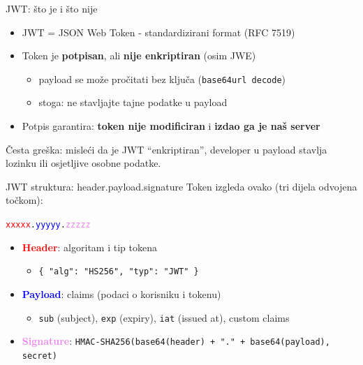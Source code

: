 \begin{frame}{JWT: što je i što nije}
	\begin{itemize}
		\item JWT = JSON Web Token - standardizirani format (RFC 7519)
		\item Token je \textbf{potpisan}, ali \textbf{nije enkriptiran} (osim JWE)
		\begin{itemize}
			\item payload se može pročitati bez ključa (\texttt{base64url decode})
			\item stoga: ne stavljajte tajne podatke u payload
		\end{itemize}
		\item Potpis garantira: \textbf{token nije modificiran} i \textbf{izdao ga je naš server}
	\end{itemize}

	\vspace{0.6em}
	Česta greška: misleći da je JWT \enquote{enkriptiran}, developer u payload stavlja lozinku ili osjetljive osobne podatke.
\end{frame}

\begin{frame}{JWT struktura: header.payload.signature}
	Token izgleda ovako (tri dijela odvojena točkom):
	\vspace{0.3em}
	\begin{center}
		\texttt{\textcolor{red}{xxxxx}.\textcolor{blue}{yyyyy}.\textcolor{violet}{zzzzz}}
	\end{center}

	\vspace{0.6em}
	\begin{itemize}
		\item \textcolor{red}{\textbf{Header}}: algoritam i tip tokena
		\begin{itemize}
			\item \texttt{\{ "alg": "HS256", "typ": "JWT" \}}
		\end{itemize}
		\item \textcolor{blue}{\textbf{Payload}}: claims (podaci o korisniku i tokenu)
		\begin{itemize}
			\item \texttt{sub} (subject), \texttt{exp} (expiry), \texttt{iat} (issued at), custom claims
		\end{itemize}
		\item \textcolor{violet}{\textbf{Signature}}: \texttt{HMAC-SHA256(base64(header) + "." + base64(payload), secret)}
	\end{itemize}
\end{frame}


